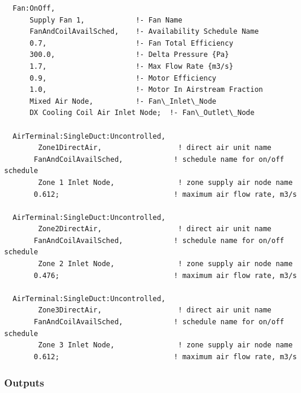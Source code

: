 \begin{lstlisting}
  Fan:OnOff,
      Supply Fan 1,            !- Fan Name
      FanAndCoilAvailSched,    !- Availability Schedule Name
      0.7,                     !- Fan Total Efficiency
      300.0,                   !- Delta Pressure {Pa}
      1.7,                     !- Max Flow Rate {m3/s}
      0.9,                     !- Motor Efficiency
      1.0,                     !- Motor In Airstream Fraction
      Mixed Air Node,          !- Fan\_Inlet\_Node
      DX Cooling Coil Air Inlet Node;  !- Fan\_Outlet\_Node

  AirTerminal:SingleDuct:Uncontrolled,
        Zone1DirectAir,                  ! direct air unit name
       FanAndCoilAvailSched,            ! schedule name for on/off schedule
        Zone 1 Inlet Node,               ! zone supply air node name
       0.612;                           ! maximum air flow rate, m3/s

  AirTerminal:SingleDuct:Uncontrolled,
        Zone2DirectAir,                  ! direct air unit name
       FanAndCoilAvailSched,            ! schedule name for on/off schedule
        Zone 2 Inlet Node,               ! zone supply air node name
       0.476;                           ! maximum air flow rate, m3/s

  AirTerminal:SingleDuct:Uncontrolled,
        Zone3DirectAir,                  ! direct air unit name
       FanAndCoilAvailSched,            ! schedule name for on/off schedule
        Zone 3 Inlet Node,               ! zone supply air node name
       0.612;                           ! maximum air flow rate, m3/s
\end{lstlisting}

\subsubsection{Outputs}\label{outputs-3-021}

